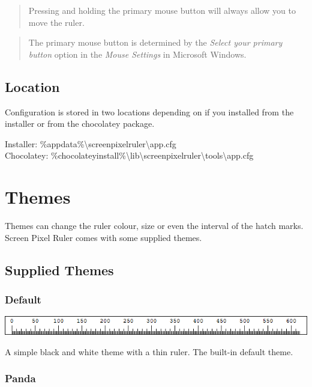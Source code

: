 \documentclass[
]{book}
\begin{document}
\begin{quote}
Pressing and holding the primary mouse button will always allow you to move the ruler.
\end{quote}

\begin{quote}
The primary mouse button is determined by the \emph{Select your primary button} option in the \emph{Mouse Settings} in Microsoft Windows.
\end{quote}

\hypertarget{location}{%
\section{Location}\label{location}}

Configuration is stored in two locations depending on if you installed from the installer or from the chocolatey package.

Installer: \%appdata\%\textbackslash screenpixelruler\textbackslash app.cfg\\
Chocolatey: \%chocolateyinstall\%\textbackslash lib\textbackslash screenpixelruler\textbackslash tools\textbackslash app.cfg

\hypertarget{themes}{%
\chapter{Themes}\label{themes}}

Themes can change the ruler colour, size or even the interval of the hatch marks.
Screen Pixel Ruler comes with some supplied themes.

\hypertarget{supplied-themes}{%
\section{Supplied Themes}\label{supplied-themes}}

\hypertarget{default}{%
\subsection{Default}\label{default}}

\includegraphics{images/theme-default.png}

A simple black and white theme with a thin ruler.
The built-in default theme.

\hypertarget{panda}{%
\subsection{Panda}\label{panda}}
\end{document}
